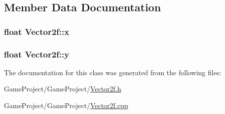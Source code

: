 \subsection{Member Data Documentation}
\hypertarget{class_vector2f_add58d2378e3a3abdb76cf0ac51c9acfc}{
\subsubsection[{x}]{\setlength{\rightskip}{0pt plus 5cm}float Vector2f\-::x}}\label{class_vector2f_add58d2378e3a3abdb76cf0ac51c9acfc}
\hypertarget{class_vector2f_a14874a72597fd358b15f8ba34b999c4d}{
\subsubsection[{y}]{\setlength{\rightskip}{0pt plus 5cm}float Vector2f\-::y}}\label{class_vector2f_a14874a72597fd358b15f8ba34b999c4d}


The documentation for this class was generated from the following files\-:\begin{DoxyCompactItemize}
\item 
Game\-Project/\-Game\-Project/\hyperlink{_vector2f_8h}{Vector2f.\-h}\item 
Game\-Project/\-Game\-Project/\hyperlink{_vector2f_8cpp}{Vector2f.\-cpp}\end{DoxyCompactItemize}
